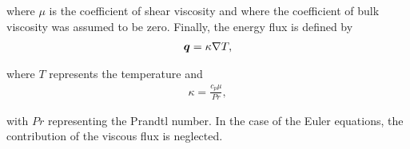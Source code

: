 where $\mu$ is the coefficient of shear viscosity  and where the coefficient of bulk viscosity was assumed to be zero. Finally, the energy flux is defined by
\begin{align*}
\varv{q} = \kappa \nabla T,
\end{align*}

where $T$ represents the temperature and
\begin{align*}
\kappa = \frac{c_p \mu}{Pr},
\end{align*}

with $Pr$ representing the Prandtl number. In the case of the Euler equations, the contribution of the viscous flux is neglected.
